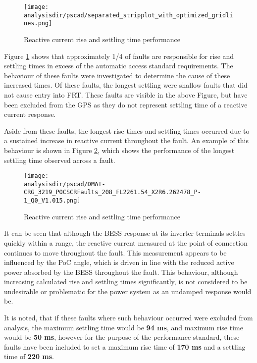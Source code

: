 \documentclass{../grid-link-report}
\newcommand{\analysisdir}{report-assets/analysis}
\begin{document}
			\begin{figure}[H]
				\centering
				\texttt{[image: \\analysisdir/pscad/separated\_stripplot\_with\_optimized\_gridlines.png]}
				\caption{Reactive current rise and settling time performance}
				\label{fig:iq-rise-settle-pscad}
			\end{figure}
			
			Figure \ref{fig:iq-rise-settle-pscad} shows that approximately 1/4 of faults are responsible for rise and settling times in excess of the automatic access standard requirements. The behaviour of these faults were investigated to determine the cause of these increased times. Of these faults, the longest settling were shallow faults that did not cause entry into FRT. These faults are visible in the above Figure, but have been excluded from the GPS as they do not represent settling time of a reactive current response. 
			
			Aside from these faults, the longest rise times and settling times occurred due to a sustained increase in reactive current throughout the fault. An example of this behaviour is shown in Figure \ref{fig:longest-settling-time}, which shows the performance of the longest settling time observed across a fault.
			
			\begin{figure}[H]
				\centering
				\texttt{[image: \\analysisdir/pscad/DMAT-CRG\_3219\_POCSCRFaults\_208\_FL2261.54\_X2R6.262478\_P-1\_Q0\_V1.015.png]}
				\caption{Reactive current rise and settling time performance}
				\label{fig:longest-settling-time}
			\end{figure}
			
			It can be seen that although the BESS response at its inverter terminals settles quickly within a range, the reactive current measured at the point of connection continues to move throughout the fault. This measurement appears to be influenced by the PoC angle, which is driven in line with the reduced active power absorbed by the BESS throughout the fault. This behaviour, although increasing calculated rise and settling times significantly, is not considered to be undesirable or problematic for the power system as an undamped response would be. 
			
			It is noted, that if these faults where such behaviour occurred were excluded from analysis, the maximum  settling time would be \textbf{94 ms}, and maximum rise time would be \textbf{50 ms}, however for the purpose of the performance standard, these faults have been included to set a maximum rise time of \textbf{170 ms} and a settling time of \textbf{220 ms}.
			
\end{document}
